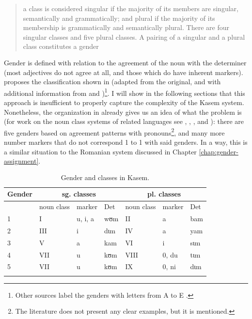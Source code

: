 \begin{quotation}
a class is considered singular if the majority of its members are singular, semantically and grammatically; and plural if the majority of its membership is grammatically and semantically plural. There are four singular classes and five plural classes. A pairing of a singular and a plural class constitutes a gender \autocite[4]{Awedoba.2003}
\end{quotation}

Gender is defined with relation to the agreement of the noun with the determiner (most adjectives do not agree at all, and those which do have inherent markers). \textcite[3]{Awedoba.2003} proposes the  classification shown in  (adapted from the original, and with additional information from \citealt{Awedoba.1980} and \citealt{Awedoba.1996})\footnote{Other sources label the genders with letters from A to E \autocite{Callow.1965}.}. I will show in the following sections that this approach is insufficient to properly capture the complexity of the Kasem system. Nonetheless, the organization in  already gives us an idea of what the problem is (for work on the noun class systems of related languages see \citealt{Brindle.2009}, \citealt{Bodomo.1994}, \citealt{Bodomo.1997}, and \citealt{Dakubu.1997}): there are five genders based on agreement patterns with pronouns\footnote{The literature does not present any clear examples, but it is mentioned.}, and many more number markers that do not correspond 1 to 1 with said genders. In a way, this is a similar situation to the Romanian system discussed in Chapter \ref{chap:gender-assignment}.

\begin{table}[!htb]
  \centering
  \begin{tabular}{lllllll}
    \lsptoprule
    Gender & \multicolumn{3}{c}{sg. classes} & \multicolumn{3}{c}{pl. classes}           \\

    \midrule
      & noun class & marker  & Det & noun class & marker & Det \\
    1 & I          & u, i, a & wʊm & II         & a      & bam \\
    2 & III        & i       & dɩm & IV         & a      & yam \\
    3 & V          & a       & kam & VI         & i      & sɩm \\
    4 & VII        & u       & kʊm & VIII       & 0, du  & tɩm \\
    5 & VII        & u       & kʊm & IX         & 0, ni  & dɩm \\
    \lspbottomrule
  \end{tabular}\caption{Gender and classes in Kasem.}\label{tab:gender-class-kasem}
\end{table}

